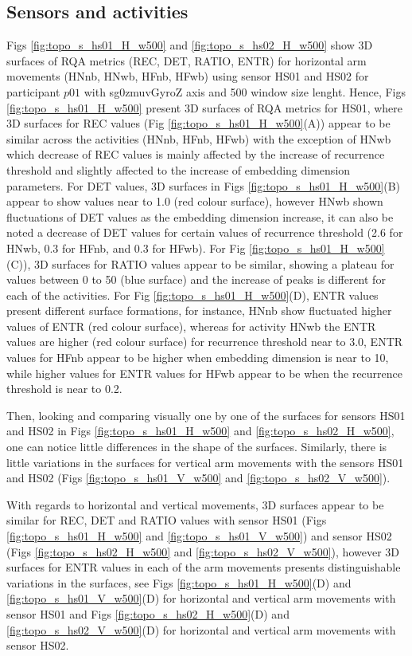 \subsection{Sensors and activities}
Figs \ref{fig:topo_s_hs01_H_w500} and \ref{fig:topo_s_hs02_H_w500} show
3D surfaces of RQA metrics (REC, DET, RATIO, ENTR) for horizontal arm 
movements (HNnb, HNwb, HFnb, HFwb) using sensor HS01 and HS02 
for participant $p01$ with sg0zmuvGyroZ axis and 500 window size lenght.
Hence, Figs \ref{fig:topo_s_hs01_H_w500} present 3D surfaces of RQA metrics 
for HS01, where 3D surfaces for REC values 
(Fig \ref{fig:topo_s_hs01_H_w500}(A)) appear to be similar across 
the activities (HNnb, HFnb, HFwb) with the exception of HNwb which 
decrease of REC values is mainly affected by the increase of recurrence 
threshold and slightly affected to the increase of embedding dimension 
parameters. For DET values, 3D surfaces in Figs \ref{fig:topo_s_hs01_H_w500}(B)
appear to show values near to 1.0 (red colour surface), however HNwb 
shown fluctuations of DET values as the embedding dimension increase, 
it can also be noted a decrease of DET values for certain values of 
recurrence threshold (2.6 for HNwb, 0.3 for HFnb, and 0.3 for HFwb).
For Fig \ref{fig:topo_s_hs01_H_w500}(C)), 3D surfaces for RATIO values 
appear to be similar, showing a plateau for values between 0 to 50 
(blue surface) and the increase of peaks is different for each of the 
activities.
For Fig \ref{fig:topo_s_hs01_H_w500}(D), ENTR values present different 
surface formations, for instance, 
HNnb show fluctuated higher values of ENTR (red colour surface),
whereas for activity HNwb the ENTR values are higher (red colour surface) 
for recurrence threshold near to 3.0,
ENTR values for HFnb appear to be higher when embedding dimension is near 
to 10, while higher values for ENTR values for HFwb appear to be 
when the recurrence threshold is near to 0.2.

Then, looking and comparing visually one by one of the surfaces for sensors 
HS01 and HS02 in Figs \ref{fig:topo_s_hs01_H_w500} 
and \ref{fig:topo_s_hs02_H_w500}, one can notice little differences in the 
shape of the surfaces.
Similarly, there is little variations in the surfaces for vertical arm 
movements with the sensors HS01 and HS02 
(Figs \ref{fig:topo_s_hs01_V_w500} and \ref{fig:topo_s_hs02_V_w500}).

With regards to horizontal and vertical movements, 
3D surfaces appear to be similar for REC, DET and RATIO values
with sensor HS01
(Figs \ref{fig:topo_s_hs01_H_w500} and \ref{fig:topo_s_hs01_V_w500})
and sensor HS02
(Figs \ref{fig:topo_s_hs02_H_w500} and \ref{fig:topo_s_hs02_V_w500}), 
however 3D surfaces for ENTR values in each of the arm movements
presents distinguishable variations in the surfaces,
see Figs \ref{fig:topo_s_hs01_H_w500}(D) and \ref{fig:topo_s_hs01_V_w500}(D) 
for horizontal and vertical arm movements with sensor HS01 and
Figs \ref{fig:topo_s_hs02_H_w500}(D) and \ref{fig:topo_s_hs02_V_w500}(D) 
for horizontal and vertical arm movements with sensor HS02.


